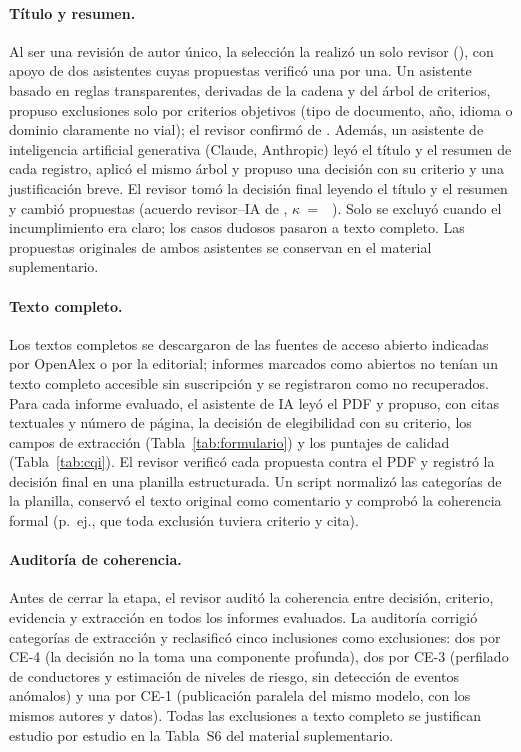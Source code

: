 \documentclass[12pt, a4paper]{article}
\begin{document}
\paragraph{Título y resumen.} Al ser una revisión de autor único, la selección la realizó un solo revisor (\Revisor), con apoyo de dos asistentes cuyas propuestas verificó una por una. Un asistente basado en reglas transparentes, derivadas de la cadena y del árbol de criterios, propuso exclusiones solo por criterios objetivos (tipo de documento, año, idioma o dominio claramente no vial); el revisor confirmó \NExclReglaConfirmadas{} de \NExclRegla. Además, un asistente de inteligencia artificial generativa (Claude, Anthropic) leyó el título y el resumen de cada registro, aplicó el mismo árbol y propuso una decisión con su criterio y una justificación breve. El revisor tomó la decisión final leyendo el título y el resumen y cambió \NCambiosIATA{} propuestas (acuerdo revisor--IA de \AcuerdoIATA, $\kappa$~=~\KappaIATA~\cite{cohen1960coefficient}). Solo se excluyó cuando el incumplimiento era claro; los casos dudosos pasaron a texto completo. Las propuestas originales de ambos asistentes se conservan en el material suplementario.

\paragraph{Texto completo.} Los textos completos se descargaron de las fuentes de acceso abierto indicadas por OpenAlex o por la editorial; \PnoRecuperados{} informes marcados como abiertos no tenían un texto completo accesible sin suscripción y se registraron como no recuperados. Para cada informe evaluado, el asistente de IA leyó el PDF y propuso, con citas textuales y número de página, la decisión de elegibilidad con su criterio, los campos de extracción (Tabla~\ref{tab:formulario}) y los puntajes de calidad (Tabla~\ref{tab:cqi}). El revisor verificó cada propuesta contra el PDF y registró la decisión final en una planilla estructurada. Un script normalizó las categorías de la planilla, conservó el texto original como comentario y comprobó la coherencia formal (p.~ej., que toda exclusión tuviera criterio y cita).

\paragraph{Auditoría de coherencia.} Antes de cerrar la etapa, el revisor auditó la coherencia entre decisión, criterio, evidencia y extracción en todos los informes evaluados. La auditoría corrigió categorías de extracción y reclasificó cinco inclusiones como exclusiones: dos por CE-4 (la decisión no la toma una componente profunda), dos por CE-3 (perfilado de conductores y estimación de niveles de riesgo, sin detección de eventos anómalos) y una por CE-1 (publicación paralela del mismo modelo, con los mismos autores y datos). Todas las exclusiones a texto completo se justifican estudio por estudio en la Tabla~S6 del material suplementario.
\end{document}

